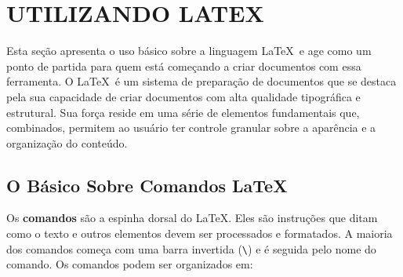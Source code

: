 \chapter{\MakeUppercase{Utilizando \LaTeX}}\label{sec:latex}

Esta seção apresenta o uso básico sobre a linguagem \LaTeX\ e age como um ponto de partida para quem está começando a criar documentos com essa ferramenta. O \LaTeX\ é um sistema de preparação de documentos que se destaca pela sua capacidade de criar documentos com alta qualidade tipográfica e estrutural. Sua força reside em uma série de elementos fundamentais que, combinados, permitem ao usuário ter controle granular sobre a aparência e a organização do conteúdo.


\section{O Básico Sobre Comandos \LaTeX}

Os \textbf{comandos} são a espinha dorsal do \LaTeX. Eles são instruções que ditam como o texto e outros elementos devem ser processados e formatados. A maioria dos comandos começa com uma barra invertida (\verb|\|) e é seguida pelo nome do comando. Os comandos podem ser organizados em:

